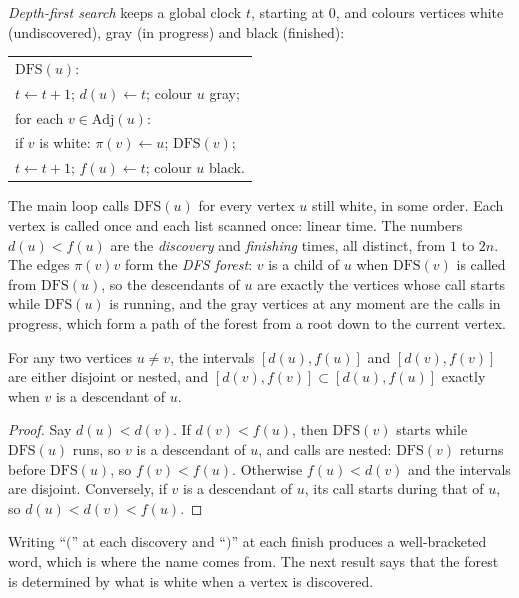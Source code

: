 \emph{Depth-first search} keeps a global clock $t$, starting at $0$, and colours vertices white (undiscovered), gray (in progress) and black (finished):
\begin{center}
\begin{tabular}{l}
$\mathrm{DFS}(u)$:\\
\quad $t\gets t+1$; $d(u)\gets t$; colour $u$ gray;\\
\quad for each $v\in\mathrm{Adj}(u)$:\\
\qquad if $v$ is white: $\pi(v)\gets u$; $\mathrm{DFS}(v)$;\\
\quad $t\gets t+1$; $f(u)\gets t$; colour $u$ black.
\end{tabular}
\end{center}
The main loop calls $\mathrm{DFS}(u)$ for every vertex $u$ still white, in some order. Each vertex is called once and each list scanned once: linear time. The numbers $d(u)<f(u)$ are
the \emph{discovery} and \emph{finishing} times, all distinct, from $1$ to $2n$. The edges $\pi(v)v$ form the \emph{DFS forest}: $v$ is a child of $u$ when $\mathrm{DFS}(v)$ is called from
$\mathrm{DFS}(u)$, so the descendants of $u$ are exactly the vertices whose call starts while $\mathrm{DFS}(u)$ is running, and the gray vertices at any moment are the
calls in progress, which form a path of the forest from a root down to the current vertex.

\begin{theorem}\label{thm:parenthesis}
For any two vertices $u\ne v$, the intervals $[d(u),f(u)]$ and $[d(v),f(v)]$ are either disjoint or nested, and $[d(v),f(v)]\subset[d(u),f(u)]$ exactly when $v$ is a descendant of $u$.
\end{theorem}
\begin{proof}
Say $d(u)<d(v)$. If $d(v)<f(u)$, then $\mathrm{DFS}(v)$ starts while $\mathrm{DFS}(u)$ runs, so $v$ is a descendant of $u$, and calls are nested: $\mathrm{DFS}(v)$ returns before $\mathrm{DFS}(u)$, so
$f(v)<f(u)$. Otherwise $f(u)<d(v)$ and the intervals are disjoint. Conversely, if $v$ is a descendant of $u$, its call starts during that of $u$, so $d(u)<d(v)<f(u)$.
\end{proof}

Writing ``$($'' at each discovery and ``$)$'' at each finish produces a well-bracketed word, which is where the name comes from. The next result says that the forest is determined
by what is white when a vertex is discovered.


